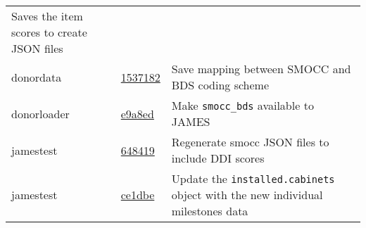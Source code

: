\documentclass[]{book}
\begin{document}
\begin{longtable}[]{@{}lll@{}}
\begin{minipage}[t]{0.36\columnwidth}
Saves the item scores to create JSON files\strut
\end{minipage}\tabularnewline
\begin{minipage}[t]{0.26\columnwidth}\raggedright
donordata\strut
\end{minipage} & \begin{minipage}[t]{0.29\columnwidth}\raggedright
\href{https://github.com/stefvanbuuren/donordata/commit/1537182a0df4180e0000d59225c6355a9c506472}{1537182}\strut
\end{minipage} & \begin{minipage}[t]{0.36\columnwidth}\raggedright
Save mapping between SMOCC and BDS coding scheme\strut
\end{minipage}\tabularnewline
\begin{minipage}[t]{0.26\columnwidth}\raggedright
donorloader\strut
\end{minipage} & \begin{minipage}[t]{0.29\columnwidth}\raggedright
\href{https://github.com/stefvanbuuren/donorloader/commit/e9a8ed9054ebe1ba3a060883d53cfa0ce1f963d2}{e9a8ed}\strut
\end{minipage} & \begin{minipage}[t]{0.36\columnwidth}\raggedright
Make \texttt{smocc\_bds} available to JAMES\strut
\end{minipage}\tabularnewline
\begin{minipage}[t]{0.26\columnwidth}\raggedright
jamestest\strut
\end{minipage} & \begin{minipage}[t]{0.29\columnwidth}\raggedright
\href{https://github.com/stefvanbuuren/jamestest/commit/6484191fd8de0d93b35354aa3ee846447aa81df6}{648419}\strut
\end{minipage} & \begin{minipage}[t]{0.36\columnwidth}\raggedright
Regenerate smocc JSON files to include DDI scores\strut
\end{minipage}\tabularnewline
\begin{minipage}[t]{0.26\columnwidth}\raggedright
jamestest\strut
\end{minipage} & \begin{minipage}[t]{0.29\columnwidth}\raggedright
\href{https://github.com/stefvanbuuren/jamestest/commit/ce1dbe5591ca7182fef05ea6c5cb0d1361e876dc}{ce1dbe}\strut
\end{minipage} & \begin{minipage}[t]{0.36\columnwidth}\raggedright
Update the \texttt{installed.cabinets} object with the new individual milestones data\strut

\end{minipage}
\end{longtable}
\end{document}
